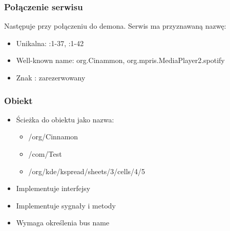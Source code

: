 \begin{frame}
    \frametitle{Połączenie serwisu}
    Następuje przy połączeniu do demona.
    Serwis ma przyznawaną nazwę:
    \begin{itemize}
        \item Unikalna: :1-37, :1-42
        \item Well-known name: org.Cinammon, org.mpris.MediaPlayer2.spotify
        \item Znak : zarezerwowany
    \end{itemize}
\end{frame}

\begin{frame}
    \frametitle{Obiekt}
    \begin{itemize}
        \item Ścieżka do obiektu jako nazwa: 
        \begin{itemize}
            \item /org/Cinnamon 
            \item /com/Test
            \item /org/kde/kspread/sheets/3/cells/4/5
        \end{itemize}
        \item Implementuje interfejsy
        \item Implementuje sygnały i metody
        \item Wymaga określenia bus name
    \end{itemize}
\end{frame}
